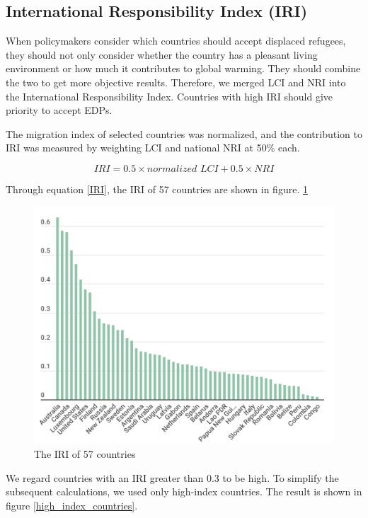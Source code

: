 \documentclass[12pt]{article}  %
\begin{document}
\subsection{International Responsibility Index (IRI)}

When policymakers consider which countries should accept displaced refugees, they should not only consider whether the country has a pleasant living environment or how much it contributes to global warming. They should combine the two to get more objective results. Therefore, we merged LCI and NRI into the International Responsibility Index. Countries with high IRI should give priority to accept EDPs.

The migration index of selected countries was normalized, and the contribution to IRI was measured by weighting LCI and national NRI at 50\% each.


\begin{equation}\label{IRI}
    IRI=0.5\times normalized\,\,LCI+0.5\times NRI
\end{equation}


Through equation \eqref{IRI}, the IRI of 57 countries are shown in figure. \ref{country_index}

\begin{figure}[htbp]
	\centering
	\includegraphics[width=.8\textwidth]{IRI.png}
	\caption{ The IRI of 57 countries}\label{country_index}
\end{figure}

\newpage



We regard countries with an IRI greater than 0.3 to be high. To simplify the subsequent calculations, we used only high-index countries. The result is shown in figure \ref{high_index_countries}.
\end{document}
